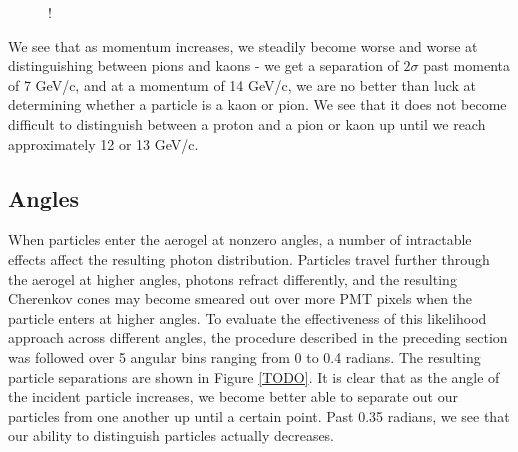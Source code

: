 \begin{figure}[]
\centering
{}
\caption[\TODO{}]{!}
\end{figure}

We see that as momentum increases, we steadily become worse and worse at distinguishing between pions and kaons - we get a separation of $2 \sigma$ past momenta of 7 GeV/c, and at a momentum of 14 GeV/c, we are no better than luck at determining whether a particle is a kaon or pion.
We see that it does not become difficult to distinguish between a proton and a pion or kaon up until we reach approximately 12 or 13 GeV/c. 

\subsection{Angles}
When particles enter the aerogel at nonzero angles, a number of intractable effects affect the resulting photon distribution. 
Particles travel further through the aerogel at higher angles, photons refract differently, and the resulting Cherenkov cones may become smeared out over more PMT pixels when the particle enters at higher angles. 
To evaluate the effectiveness of this likelihood approach across different angles, the procedure described in the preceding section was followed over 5 angular bins ranging from 0 to 0.4 radians.
The resulting particle separations are shown in Figure \ref{TODO}.
It is clear that as the angle of the incident particle increases, we become better able to separate out our particles from one another up until a certain point.
Past 0.35 radians, we see that our ability to distinguish particles actually decreases.
 

